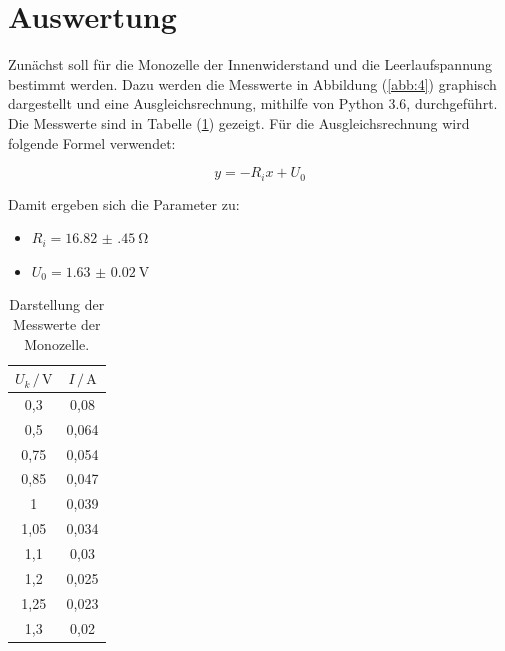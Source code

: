 \section{Auswertung}
Zunächst soll für die Monozelle der Innenwiderstand und die Leerlaufspannung
bestimmt werden. Dazu werden die Messwerte in Abbildung (\ref{abb:4}) graphisch dargestellt und eine Ausgleichsrechnung,
mithilfe von Python 3.6, durchgeführt. Die Messwerte sind in Tabelle (\ref{tab:1})
gezeigt. Für die Ausgleichsrechnung wird folgende Formel verwendet:

\begin{equation}
  y = -R_i x + U_0
  \label{eq:4}
\end{equation}

Damit ergeben sich die Parameter zu:

\begin{itemize}
  \item $R_i = \SI{16.82(45)}{\ohm}$
  \item $U_0 = \SI{1.63(2)}{\volt}$
\end{itemize}

\begin{table}[H]
  \centering
  \caption{Darstellung der Messwerte der Monozelle.}
  \label{tab:1}
  \begin{tabular}{c c}
    \toprule
    $U_k \, / \, \si{\volt}$ & $ I \, / \, \si{\ampere}$ \\
    \midrule
    0,3  & 0,08  \\
    0,5  & 0,064 \\
    0,75 & 0,054 \\
    0,85 & 0,047 \\
    1    & 0,039 \\
    1,05 & 0,034 \\
    1,1  & 0,03  \\
    1,2  & 0,025 \\
    1,25 & 0,023 \\
    1,3  & 0,02  \\
    \bottomrule
  \end{tabular}
\end{table}

